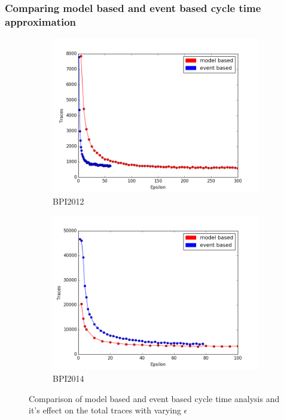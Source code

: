 \documentclass[
	a4paper,
	pagesize,
	pdftex,
	12pt,
	twoside, %
	BCOR=5mm, %
	ngerman,
	fleqn,
	final,
	]{scrartcl}
\begin{document}
\subsubsection{Comparing model based and event based cycle time approximation}
\begin{figure}[h]
	\begin{subfigure}{.5\textwidth}
	  \centering
	  \includegraphics[width=.9\linewidth]{data/BPI2012_lax_vs_strict.png}
	  \caption{BPI2012}
	  \label{fig:eventmodelcomparison12}
	\end{subfigure}%
	\begin{subfigure}{.5\textwidth}
	  \centering
	  \includegraphics[width=.9\linewidth]{data/BPI2014_lax_vs_strict.png}
	  \caption{BPI2014}
	  \label{fig:eventmodelcomparison14}
	\end{subfigure}
	\caption{Comparison of model based and event based cycle time analysis and it's effect on the total traces with varying $\epsilon$}
	\label{fig:eventmodelcomparison1214}
\end{figure}
\end{document}
